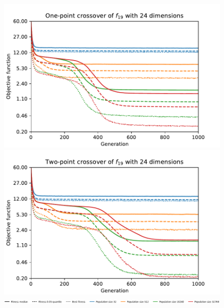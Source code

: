 \begin{figure}[ht!]
\begin{minipage}[t]{0.32\textwidth}
    \end{minipage}
    \\
    \centering
    \begin{minipage}[t]{0.32\textwidth}
        \includegraphics[width=\textwidth]{img/runs/fitness_es_crossover_f19_dim24_OnePoint1D.pdf}
    \end{minipage}
    \begin{minipage}[t]{0.32\textwidth}
        \centering
        \includegraphics[width=\textwidth]{img/runs/fitness_es_crossover_f19_dim24_TwoPoint1D.pdf}
    \end{minipage}

    \begin{minipage}{\textwidth}
        \centering
        \includegraphics[width=\textwidth]{img/runs/fitness_es_crossovers_legend.pdf}
    \end{minipage}

    \caption[Fitness of crossover operators]{}
\end{figure}





